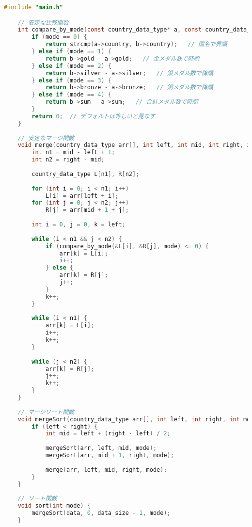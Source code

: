 \documentclass[a4paper,11pt]{jsarticle}
\begin{document}
\begin{lstlisting}[caption=sort関数のコード, label=sort, language=C]
    #include "main.h"

    // 安定な比較関数
    int compare_by_mode(const country_data_type* a, const country_data_type* b, int mode) {
        if (mode == 0) {
            return strcmp(a->country, b->country);   // 国名で昇順
        } else if (mode == 1) {
            return b->gold - a->gold;   // 金メダル数で降順
        } else if (mode == 2) {
            return b->silver - a->silver;   // 銀メダル数で降順
        } else if (mode == 3) {
            return b->bronze - a->bronze;   // 銅メダル数で降順
        } else if (mode == 4) {
            return b->sum - a->sum;   // 合計メダル数で降順
        }
        return 0;  // デフォルトは等しいと見なす
    }
    
    // 安定なマージ関数
    void merge(country_data_type arr[], int left, int mid, int right, int mode) {
        int n1 = mid - left + 1;
        int n2 = right - mid;
    
        country_data_type L[n1], R[n2];
    
        for (int i = 0; i < n1; i++)
            L[i] = arr[left + i];
        for (int j = 0; j < n2; j++)
            R[j] = arr[mid + 1 + j];
    
        int i = 0, j = 0, k = left;
    
        while (i < n1 && j < n2) {
            if (compare_by_mode(&L[i], &R[j], mode) <= 0) {
                arr[k] = L[i];
                i++;
            } else {
                arr[k] = R[j];
                j++;
            }
            k++;
        }
    
        while (i < n1) {
            arr[k] = L[i];
            i++;
            k++;
        }
    
        while (j < n2) {
            arr[k] = R[j];
            j++;
            k++;
        }
    }
    
    // マージソート関数
    void mergeSort(country_data_type arr[], int left, int right, int mode) {
        if (left < right) {
            int mid = left + (right - left) / 2;
    
            mergeSort(arr, left, mid, mode);
            mergeSort(arr, mid + 1, right, mode);
    
            merge(arr, left, mid, right, mode);
        }
    }
    
    // ソート関数
    void sort(int mode) {
        mergeSort(data, 0, data_size - 1, mode);
    }
\end{lstlisting}
\end{document}
